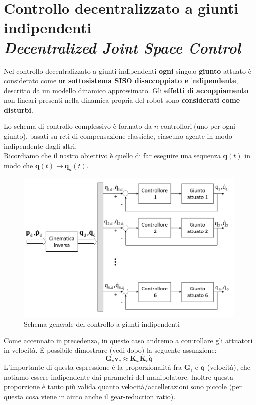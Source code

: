 \section[Controllo decentralizzato a giunti indipendenti]{Controllo decentralizzato a giunti indipendenti \\ {\small \textit{Decentralized Joint Space Control}}}

Nel controllo decentralizzato a giunti indipendenti \textbf{ogni} singolo \textbf{giunto} attuato è considerato come un \textbf{sottosistema SISO disaccoppiato e indipendente}, descritto da un modello dinamico approssimato. Gli \textbf{effetti di accoppiamento} non-lineari presenti nella dinamica propria del robot sono \textbf{considerati come disturbi}.

Lo schema di controllo complessivo è formato da $n$ controllori (uno per ogni giunto), basati su reti di compensazione classiche, ciascuno agente in modo indipendente dagli altri.\\
Ricordiamo che il nostro obiettivo è quello di far eseguire una sequenza $\mathbf{q}(t)$ in modo che $\mathbf{q}(t) \to \mathbf{q}_d(t)$.\\	


\begin{figure}[th!]
	\centering
	\includegraphics[width=0.7\linewidth]{images/decentralized_joint_space_control_1}
	\caption{Schema generale del controllo a giunti indipendenti}
	\label{fig:decentralizedjointspacecontrol1}
\end{figure}


Come accennato in precedenza, in questo caso andremo a controllare gli attuatori in velocità. È possibile dimostrare (vedi dopo) la seguente assunzione:
$$
\mathbf{G}_v\mathbf{v}_c \approx \mathbf{K}_\omega\mathbf{K}_r\mathbf{\dot{q}}
$$
L'importante di questa espressione è la proporzionalità fra $\mathbf{G}_v$ e  $\dot{\mathbf{q}}$ (velocità), che notiamo essere indipendente dai parametri del manipolatore. Inoltre questa proporzione è tanto più valida quanto velocità/accellerazioni sono piccole (per questa cosa viene in aiuto anche il gear-reduction ratio).

